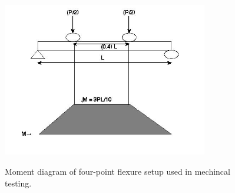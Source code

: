 \documentclass[12pt]{article}
\begin{document}
\begin{figure}[H]
\includegraphics[width=0.8\textwidth]{4ptMomentDiagram.jpg}\label{fig:Mdiagram}
\caption{Moment diagram of four-point flexure setup used in mechincal testing.}
\end{figure}

\end{document}
